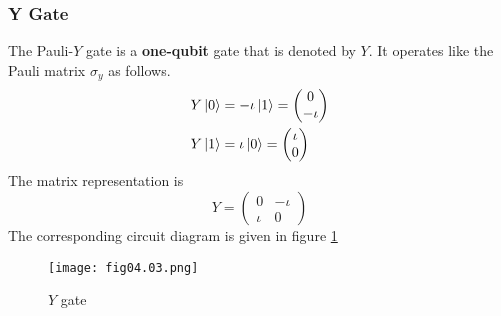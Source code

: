 \subsubsection*{Y Gate}
The Pauli-$Y$ gate is a \textbf{one-qubit} gate that is denoted by $Y$. It operates like the Pauli matrix $\sigma_y$ as follows.
\begin{equation*}
\begin{split}
Y\left\vert 0\right\rangle&=-\iota\left\vert 1\right\rangle=
\begin{pmatrix}
0\\
-\iota
\end{pmatrix}\\
Y\left\vert 1\right\rangle&=\iota\left\vert 0\right\rangle=
\begin{pmatrix}
\iota\\
0
\end{pmatrix}\\
\end{split}
\end{equation*}
The matrix representation is
\begin{equation*}
Y=
\begin{pmatrix}
0&-\iota\\
\iota&0
\end{pmatrix}
\end{equation*}
The corresponding circuit diagram is given in figure \ref{Fig:4.3}
\begin{figure}[!htb]
   \begin{minipage}{\textwidth}
     \centering
     \texttt{[image: fig04.03.png]}
     \caption{$Y$ gate}
     \label{Fig:4.3}
   \end{minipage}
\end{figure}

